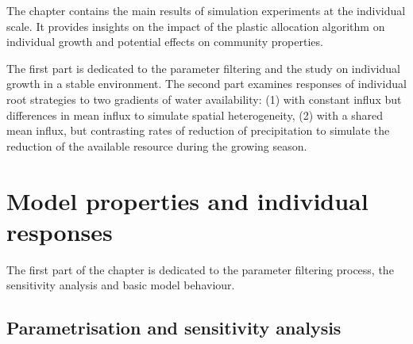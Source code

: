 
\begin{fullwidth}
The chapter contains the main results of simulation experiments at the individual scale. It provides insights on the impact of the plastic allocation algorithm on individual growth and potential effects on community properties. 

The first part is dedicated to the parameter filtering and the study on individual growth in a stable environment. The second part examines responses of individual root strategies to two gradients of water availability: (1) with constant influx but differences in mean influx to simulate spatial heterogeneity, (2) with a shared mean influx, but contrasting rates of reduction of precipitation to simulate the reduction of the available resource during the growing season.
\end{fullwidth}

\chapter{Model properties and individual responses}


The first part of the chapter is dedicated to the parameter filtering process, the sensitivity analysis and basic model behaviour. %


\section{Parametrisation and sensitivity analysis} \label{section:calibration}

